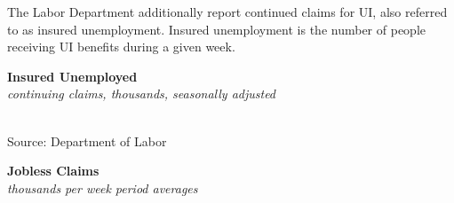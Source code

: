 \documentclass{report}
\newcommand{\tbllink}[1]{\href{https://raw.githubusercontent.com/bdecon/US-chartbook/master/chartbook/data/#1}{\faTable}}
\newcommand{\shticks}{
		date coordinates in=x, axis line style={draw=none},
		xmax={2023-10-01},
		}
\newcommand{\bbar}[2]{extra #1 ticks = {{#2}}, extra #1 tick labels = ,
		extra #1 tick style = {grid=major, grid style={thick, black!25}},}
\newcommand{\stdline}[4]{\addplot[very thick, no markers, color=#1] 
		table [x=#2, y=#3, col sep=comma] {#4};	}
\begin{document}
{\begin{minipage}{0.76\textwidth}
\small The Labor Department additionally report continued claims for UI, also referred to as insured unemployment. Insured unemployment is the number of people receiving UI benefits during a given week. 
\end{minipage}
\vspace{0.5mm}

\begin{minipage}{0.42\textwidth}
\normalsize \textbf{Insured Unemployed}\\
\footnotesize{\textit{continuing claims, thousands, seasonally adjusted}}
\vspace*{-2mm}

\hspace*{-2mm} \\
\footnotesize{Source: Department of Labor} \hfill \tbllink{ccsa.csv} \hspace{1mm}
\end{minipage} \hspace{4mm} \begin{minipage}{0.3\textwidth}
\small 


\end{minipage}
\vspace{5mm}

\begin{minipage}{0.76\textwidth}
\normalsize \textbf{Jobless Claims}\\
\footnotesize{\textit{thousands per week \hspace{52mm} period averages}}\\
\noindent \hspace*{-2mm}  \setlength{\tabcolsep}{4.1pt} \color{black!90}
		{\renewcommand{\arraystretch}{1.6}
		 \begin{tabular}{p{32mm} R{10mm} R{10mm} R{10mm} R{10mm} R{8mm} R{8mm} R{8mm} }
			  \hline
		\end{tabular}}\vspace{-2mm}
		

\end{minipage}}
\end{document}
